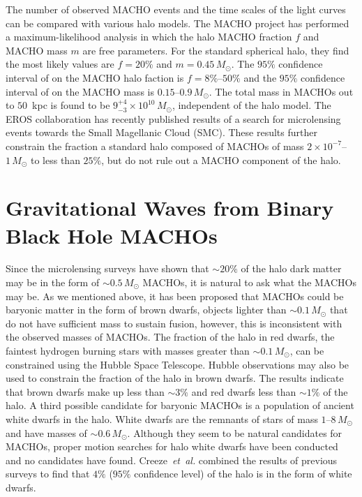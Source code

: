 The number of observed MACHO events and the time scales of the light curves
can be compared with various halo models. The MACHO project has performed a
maximum-likelihood analysis in which the halo MACHO fraction $f$ and MACHO
mass $m$ are free parameters. For the standard spherical halo, they find the
most likely values are $f = 20\%$ and $m = 0.45\,M_\odot$. The $95\%$
confidence interval of on the MACHO halo faction is $f = 8\%$--$50\%$ and the
$95\%$ confidence interval of on the MACHO mass is $0.15$--$0.9\,M_\odot$. The
total mass in MACHOs out to $50$~kpc is found to be $9_{-3}^{+4} \times
10^{10}\,M_\odot$, independent of the halo model\cite{Alcock:2000ph}.  The
EROS collaboration has recently published results of a search for microlensing
events towards the Small Magellanic Cloud (SMC)\cite{Afonso:2002xq}. These
results further constrain the fraction a standard halo composed of MACHOs of
mass $2 \times 10^{-7}$--$1\, M_\odot$ to less than $25\%$, but do not rule
out a MACHO component of the halo.

\section{Gravitational Waves from Binary Black Hole MACHOs}
\label{s:bbhmacho}

Since the microlensing surveys have shown that $\sim 20\%$ of the halo dark
matter may be in the form of $\sim 0.5\,M_\odot$ MACHOs, it is natural to ask
what the MACHOs may be. As we mentioned above, it has been proposed that
MACHOs could be baryonic matter in the form of brown dwarfs, objects lighter
than $\sim 0.1\,M_\odot$ that do not have sufficient mass to sustain fusion,
however, this is inconsistent with the observed masses of MACHOs. The fraction
of the halo in red dwarfs, the faintest hydrogen burning stars with masses
greater than $\sim 0.1\,M_\odot$, can be constrained using the Hubble Space
Telescope. Hubble observations may also be used to constrain the fraction of
the halo in brown dwarfs. The results indicate that brown dwarfs make up less
than $\sim 3\%$ and red dwarfs less than $\sim 1\%$ of the
halo\cite{Graff:1995ru,Graff:1996rz}.  A third possible candidate for baryonic
MACHOs is a population of ancient white dwarfs in the halo. White dwarfs are
the remnants of stars of mass $1$--$8\,M_\odot$ and have masses of $\sim
0.6\,M_\odot$. Although they seem to be natural candidates for MACHOs,
proper motion searches for halo white dwarfs have been conducted and no candidates have
found\cite{2002A&A...389L..69G,2002ApJ...573..644N,Creze:2004gs}.
Creeze~\emph{et~al.} combined the results of previous surveys to find that
$4\%$ ($95\%$ confidence level) of the halo is in the form of white
dwarfs\cite{Creze:2004gs}. 

